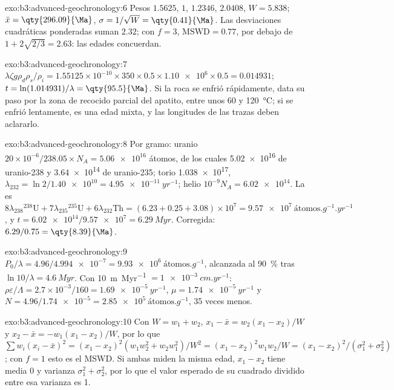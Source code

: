 \begin{solution}{exo:b3:advanced-geochronology:6}
Pesos $1.5625$, $1$, $1.2346$, $2.0408$, $W = 5.838$; $\bar x =
\qty{296.09}{\Ma}$, $\sigma = 1/\sqrt W = \qty{0.41}{\Ma}$. Las desviaciones cuadráticas ponderadas
suman $2.32$; con $f = 3$, $\mathrm{MSWD} = 0.77$, por debajo de
$1 + 2\sqrt{2/3} = 2.63$: las edades concuerdan.
\end{solution}

\begin{solution}{exo:b3:advanced-geochronology:7}
$\lambda\zeta g\rho_d\rho_s/\rho_i = 1.55125\times10^{-10}\times350\times0.5
\times\num{1.10e6}\times0.5 = 0.014931$; $t = \ln(1.014931)/\lambda =
\qty{95.5}{\Ma}$. Si la roca se enfrió rápidamente, data su paso por la
zona de recocido parcial del apatito, entre unos 60 y \qty{120}{\celsius}; si
se enfrió lentamente, es una edad mixta, y las longitudes de las trazas deben aclararlo.
\end{solution}

\begin{solution}{exo:b3:advanced-geochronology:8}
Por gramo: uranio $20\times10^{-6}/238.05\times N_A = \num{5.06e16}$ átomos, de
los cuales \num{5.02e16} de uranio-238 y \num{3.64e14} de uranio-235; torio
\num{1.038e17}, $\lambda_{232} = \ln 2/\num{1.40e10} = \qty{4.95e-11}{yr^{-1}}$;
helio $10^{-9}N_A = \num{6.02e14}$. La  es
$8\lambda_{238}{}^{238}\mathrm U + 7\lambda_{235}{}^{235}\mathrm U +
6\lambda_{232}\mathrm{Th} = (6.23 + 0.25 + 3.08)\times10^7 =
\qty{9.57e7}{\text{átomos}.g^{-1}.yr^{-1}}$, y $t = \num{6.02e14}/\num{9.57e7} =
\qty{6.29}{Myr}$. Corregida: $6.29/0.75 = \qty{8.39}{\Ma}$.
\end{solution}

\begin{solution}{exo:b3:advanced-geochronology:9}
$P_0/\lambda = 4.96/\num{4.994e-7} = \qty{9.93e6}{\text{átomos}.g^{-1}}$, alcanzada al
\qty{90}{\percent} tras $\ln 10/\lambda = \qty{4.6}{Myr}$. Con
\qty{10}{m.Myr^{-1}} $= \qty{1e-3}{cm.yr^{-1}}$: $\rho\varepsilon/\Lambda =
2.7\times10^{-3}/160 = \qty{1.69e-5}{yr^{-1}}$, $\mu = \qty{1.74e-5}{yr^{-1}}$
y $N = 4.96/\num{1.74e-5} = \qty{2.85e5}{\text{átomos}.g^{-1}}$, 35 veces menos.
\end{solution}

\begin{solution}{exo:b3:advanced-geochronology:10}
Con $W = w_1 + w_2$, $x_1 - \bar x = w_2(x_1 - x_2)/W$ y $x_2 - \bar x =
-w_1(x_1 - x_2)/W$, por lo que $\sum w_i(x_i - \bar x)^2 = (x_1 - x_2)^2(w_1w_2^2 +
w_2w_1^2)/W^2 = (x_1 - x_2)^2w_1w_2/W = (x_1 - x_2)^2/(\sigma_1^2 +
\sigma_2^2)$; con $f = 1$ esto es el MSWD. Si ambas miden la misma edad,
$x_1 - x_2$ tiene media 0 y varianza $\sigma_1^2 + \sigma_2^2$, por lo que el
valor esperado de su cuadrado dividido entre esa varianza es 1.
\end{solution}

